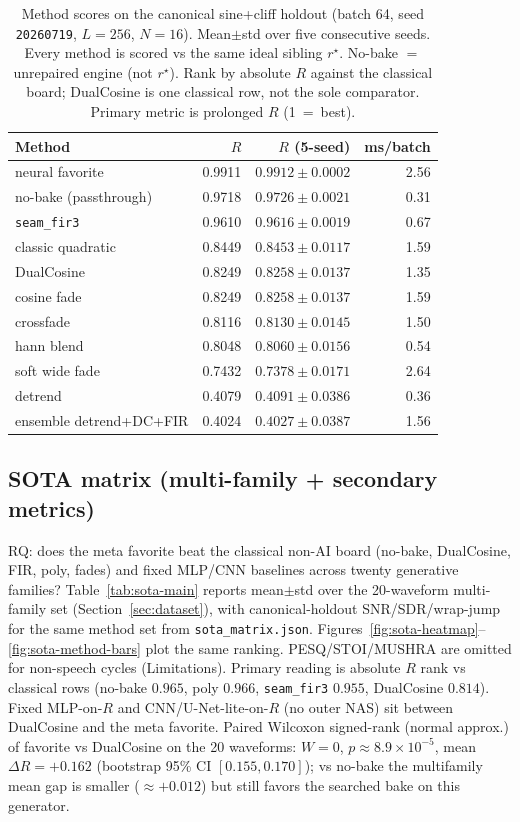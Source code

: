 \begin{table}[t]
  \centering
  \caption{Method scores on the canonical sine{+}cliff holdout (batch 64, seed \texttt{20260719}, $L{=}256$, $N{=}16$). Mean$\pm$std over five consecutive seeds. Every method is scored vs the same ideal sibling $r^{\star}$. No-bake $=$ unrepaired engine (not $r^{\star}$). Rank by absolute $R$ against the classical board; DualCosine is one classical row, not the sole comparator. Primary metric is prolonged $R$ (1~=~best).}
  \label{tab:canonical-methods}
  \setlength{\tabcolsep}{3pt}
  \begin{tabular}{@{}lrrr@{}}
    \toprule
    Method & $R$ & $R$ (5-seed) & ms/batch \\
    \midrule
    neural favorite & 0.9911 & $0.9912\pm0.0002$ & 2.56 \\
    no-bake (passthrough) & 0.9718 & $0.9726\pm0.0021$ & 0.31 \\
    \texttt{seam\_fir3} & 0.9610 & $0.9616\pm0.0019$ & 0.67 \\
    classic quadratic & 0.8449 & $0.8453\pm0.0117$ & 1.59 \\
    DualCosine & 0.8249 & $0.8258\pm0.0137$ & 1.35 \\
    cosine fade & 0.8249 & $0.8258\pm0.0137$ & 1.59 \\
    crossfade & 0.8116 & $0.8130\pm0.0145$ & 1.50 \\
    hann blend & 0.8048 & $0.8060\pm0.0156$ & 0.54 \\
    soft wide fade & 0.7432 & $0.7378\pm0.0171$ & 2.64 \\
    detrend & 0.4079 & $0.4091\pm0.0386$ & 0.36 \\
    ensemble detrend{+}DC{+}FIR & 0.4024 & $0.4027\pm0.0387$ & 1.56 \\
    \bottomrule
  \end{tabular}
\end{table}

\subsection{SOTA matrix (multi-family + secondary metrics)}
\label{sec:sota-main}

RQ: does the meta favorite beat the classical non-AI board (no-bake, DualCosine, FIR, poly, fades) and fixed MLP/CNN baselines across twenty generative families?
Table~\ref{tab:sota-main} reports mean$\pm$std over the 20-waveform multi-family set (Section~\ref{sec:dataset}), with canonical-holdout SNR/SDR/wrap-jump for the same method set from \texttt{sota\_matrix.json}.
Figures~\ref{fig:sota-heatmap}--\ref{fig:sota-method-bars} plot the same ranking.
PESQ/STOI/MUSHRA are omitted for non-speech cycles (Limitations).
Primary reading is absolute $R$ rank vs classical rows (no-bake $0.965$, poly $0.966$, \texttt{seam\_fir3} $0.955$, DualCosine $0.814$).
Fixed MLP-on-$R$ and CNN/U-Net-lite-on-$R$ (no outer NAS) sit between DualCosine and the meta favorite.
Paired Wilcoxon signed-rank (normal approx.) of favorite vs DualCosine on the 20 waveforms: $W{=}0$, $p{\approx}8.9{\times}10^{-5}$, mean $\Delta R{=}{+}0.162$ (bootstrap 95\% CI $[0.155,0.170]$); vs no-bake the multifamily mean gap is smaller ($\approx{+}0.012$) but still favors the searched bake on this generator.

